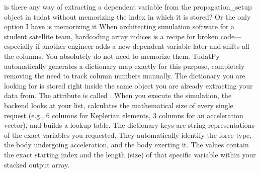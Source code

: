 {}\markdownRendererThematicBreak{}\markdownRendererInterblockSeparator
{}
\markdownRendererSectionEnd \markdownRendererSectionBegin
{}\markdownRendererInterblockSeparator
{}is there any way of extracting a dependent variable from the propagation_setup object in tudat without memorizing the index in which it is stored? Or the only option I have is memorizing it\markdownRendererInterblockSeparator
{}
\markdownRendererSectionEnd \markdownRendererSectionBegin
{}\markdownRendererInterblockSeparator
{}When architecting simulation software for a student satellite team, hardcoding array indices is a recipe for broken code—especially if another engineer adds a new dependent variable later and shifts all the columns. You absolutely do not need to memorize them.\markdownRendererInterblockSeparator
{}TudatPy automatically generates a dictionary map exactly for this purpose, completely removing the need to track column numbers manually.\markdownRendererInterblockSeparator
{}\markdownRendererSectionBegin
{}\markdownRendererInterblockSeparator
{}The dictionary you are looking for is stored right inside the same  object you are already extracting your data from.\markdownRendererInterblockSeparator
{}The attribute is called .\markdownRendererInterblockSeparator
{}
\markdownRendererSectionEnd \markdownRendererSectionBegin
{}\markdownRendererInterblockSeparator
{}When you execute the simulation, the backend looks at your  list, calculates the mathematical size of every single request (e.g., 6 columns for Keplerian elements, 3 columns for an acceleration vector), and builds a lookup table.\markdownRendererInterblockSeparator
{}\markdownRendererUlBegin
\markdownRendererUlItem {} The dictionary keys are string representations of the exact variables you requested. They automatically identify the force type, the body undergoing acceleration, and the body exerting it.\markdownRendererUlItemEnd 
\markdownRendererUlItem {} The values contain the exact starting index and the length (size) of that specific variable within your stacked output array.\markdownRendererUlItemEnd 
